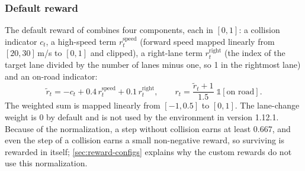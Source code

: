 \subsubsection{Default reward}
The default reward of  combines four components, each in $[0,1]$: a collision indicator $c_t$, a
high-speed term $r^{\mathrm{speed}}_t$ (forward speed mapped linearly from $[20, 30]$\,m/s to $[0,1]$ and clipped), a
right-lane term $r^{\mathrm{right}}_t$ (the index of the target lane divided by the number of lanes minus one, so 1 in
the rightmost lane) and an on-road indicator:
\begin{equation}
  \tilde{r}_t = -c_t + 0.4\, r^{\mathrm{speed}}_t + 0.1\, r^{\mathrm{right}}_t,
  \qquad
  r_t = \frac{\tilde{r}_t + 1}{1.5}\; \mathbb{1}[\text{on road}].
  \label{eq:default-reward}
\end{equation}
The weighted sum is mapped linearly from $[-1, 0.5]$ to $[0, 1]$. The lane-change weight is 0 by default and is not
used by the environment in version 1.12.1. Because of the normalization, a step without collision earns at least
0.667, and even the step of a collision earns a small non-negative reward, so surviving is rewarded in itself;
\cref{sec:reward-configs} explains why the custom rewards do not use this normalization.

